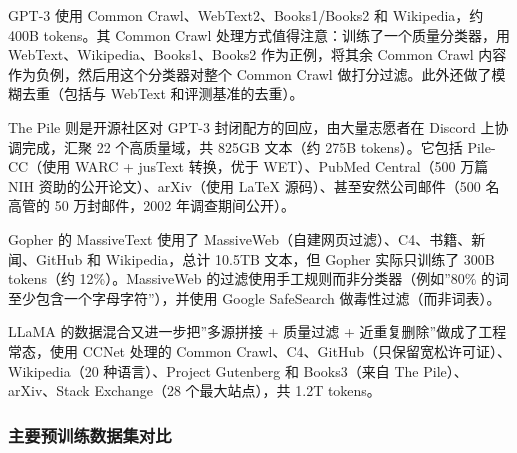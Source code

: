 \documentclass[a4paper]{article}
\begin{document}
GPT-3 使用 Common Crawl、WebText2、Books1/Books2 和 Wikipedia，约 400B tokens。其 Common Crawl 处理方式值得注意：训练了一个质量分类器，用 WebText、Wikipedia、Books1、Books2 作为正例，将其余 Common Crawl 内容作为负例，然后用这个分类器对整个 Common Crawl 做打分过滤。此外还做了模糊去重（包括与 WebText 和评测基准的去重）。

The Pile 则是开源社区对 GPT-3 封闭配方的回应，由大量志愿者在 Discord 上协调完成，汇聚 22 个高质量域，共 825GB 文本（约 275B tokens）。它包括 Pile-CC（使用 WARC + jusText 转换，优于 WET）、PubMed Central（500 万篇 NIH 资助的公开论文）、arXiv（使用 LaTeX 源码）、甚至安然公司邮件（500 名高管的 50 万封邮件，2002 年调查期间公开）。

Gopher 的 MassiveText 使用了 MassiveWeb（自建网页过滤）、C4、书籍、新闻、GitHub 和 Wikipedia，总计 10.5TB 文本，但 Gopher 实际只训练了 300B tokens（约 12\%）。MassiveWeb 的过滤使用手工规则而非分类器（例如”80\% 的词至少包含一个字母字符”），并使用 Google SafeSearch 做毒性过滤（而非词表）。

LLaMA 的数据混合又进一步把”多源拼接 + 质量过滤 + 近重复删除”做成了工程常态，使用 CCNet 处理的 Common Crawl、C4、GitHub（只保留宽松许可证）、Wikipedia（20 种语言）、Project Gutenberg 和 Books3（来自 The Pile）、arXiv、Stack Exchange（28 个最大站点），共 1.2T tokens。

\subsubsection{主要预训练数据集对比}
\end{document}
